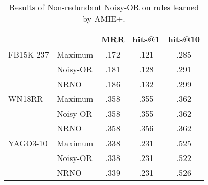 \documentclass[akbc,twoside,11pt,lettersize]{article}
\begin{document}
\begin{table}[H]
    \centering
    \begin{tabular}{llccc}
    \hline
         &  & MRR & hits@1 & hits@10 \\ \hline
        FB15K-237 & Maximum & .172 & .121 & .285 \\
         & Noisy-OR & .181 & .128 & .291 \\
         & NRNO & .186 & .132 & .299 \\ \hline
        WN18RR & Maximum & .358 & .355 & .362 \\
         & Noisy-OR & .358 & .355 & .362 \\
         & NRNO & .358 & .356 & .362 \\ \hline
        YAGO3-10 & Maximum & .338 & .231 & .525 \\
         & Noisy-OR & .338 & .231 & .522 \\
         & NRNO & .339 & .231 & .526 \\ \hline
    \end{tabular}
    \caption{ Results of Non-redundant Noisy-OR on rules learned by AMIE+.}
    \label{amieres}
\end{table}
\newpage
\end{document}
